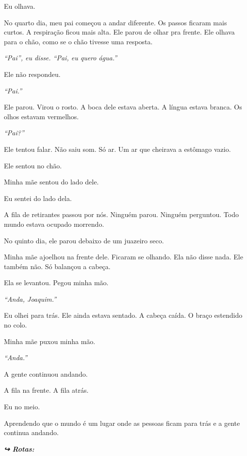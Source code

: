 \noindent Eu olhava.

\noindent No quarto dia, meu pai começou a andar diferente. Os passos ficaram mais curtos. A respiração ficou mais alta. Ele parou de olhar pra frente. Ele olhava para o chão, como se o chão tivesse uma resposta.

\noindent \textit{\textquotedblleft{}Pai\textquotedblright{}\textit{, eu disse. }\textquotedblleft{}Pai, eu quero água.\textquotedblright{}}

\noindent Ele não respondeu.

\noindent \textit{\textquotedblleft{}Pai.\textquotedblright{}}

\noindent Ele parou. Virou o rosto. A boca dele estava aberta. A língua estava branca. Os olhos estavam vermelhos.

\noindent \textit{\textquotedblleft{}Pai?\textquotedblright{}}

\noindent Ele tentou falar. Não saiu som. Só ar. Um ar que cheirava a estômago vazio.

\noindent Ele sentou no chão.

\noindent Minha mãe sentou do lado dele.

\noindent Eu sentei do lado dela.

\noindent A fila de retirantes passou por nós. Ninguém parou. Ninguém perguntou. Todo mundo estava ocupado morrendo.

\noindent No quinto dia, ele parou debaixo de um juazeiro seco.

\noindent Minha mãe ajoelhou na frente dele. Ficaram se olhando. Ela não disse nada. Ele também não. Só balançou a cabeça.

\noindent Ela se levantou. Pegou minha mão.

\noindent \textit{\textquotedblleft{}Anda, Joaquim.\textquotedblright{}}

\noindent Eu olhei para trás. Ele ainda estava sentado. A cabeça caída. O braço estendido no colo.

\noindent Minha mãe puxou minha mão.

\noindent \textit{\textquotedblleft{}Anda.\textquotedblright{}}

\noindent A gente continuou andando.

\noindent A fila na frente. A fila atrás.

\noindent Eu no meio.

\noindent Aprendendo que o mundo é um lugar onde as pessoas ficam para trás e a gente continua andando.

\vspace{0.5em}
\noindent\textit{\textbf{↪ Rotas:}  \rotasep {} \rotasep {}}
